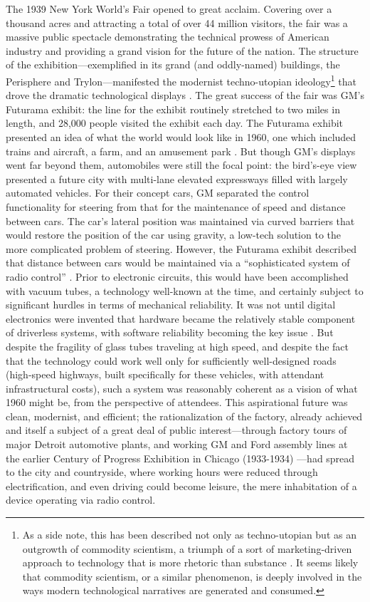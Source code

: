 The 1939 New York World's Fair opened to great acclaim. Covering over
a thousand acres and attracting a total of over 44 million visitors,
the fair was a massive public spectacle demonstrating the technical
prowess of American industry and providing a grand vision for the
future of the nation. The structure of the exhibition---exemplified in
its grand (and oddly-named) buildings, the Perisphere and
Trylon---manifested the modernist techno-utopian ideology\footnote{As a
  side note, this has been described not only as techno-utopian but as
an outgrowth of commodity scientism, a triumph of a sort of
marketing-driven approach to technology that is more rhetoric than
substance \cite{smithSelling}. It seems likely that commodity
scientism, or a similar phenomenon, is deeply involved in the ways
modern technological narratives are generated and consumed.} that drove the
dramatic technological displays \cite[p. 371]{nyeElectrifying}. The
great success of the fair was 
GM's Futurama exhibit: the line for the exhibit routinely stretched to
two miles in length, and 28,000 people visited the exhibit each day.
The Futurama exhibit presented an idea of what the world would look
like in 1960, one which included trains and aircraft, a farm, and an
amusement park \cite[p. 3-4]{wetmore}. But though GM's displays went far beyond them,
automobiles were still the focal point: the bird's-eye view presented a
future city with multi-lane elevated expressways filled with largely
automated vehicles. For their concept cars, GM separated the control
functionality for steering from that for the maintenance of speed and
distance between cars. The car's lateral position was maintained via
curved barriers that would restore the position of the car using
gravity, a low-tech solution to the more complicated problem of
steering. However, the Futurama exhibit described that distance
between cars would be maintained via a ``sophisticated system of radio
control'' \cite[p. 5]{wetmore}. Prior to electronic circuits, this would have been
accomplished with vacuum tubes, a technology well-known at the time,
and certainly subject to significant hurdles in terms of mechanical
reliability. It was not until digital electronics were invented that
hardware became the relatively stable component of driverless systems,
with software reliability becoming the key issue \cite[p.
  15]{wetmore}. But despite the 
fragility of glass tubes traveling at high speed, and despite the fact
that the technology could work well only for sufficiently
well-designed roads (high-speed highways, built specifically for these
vehicles, with attendant infrastructural costs), such a system was
reasonably coherent as a vision of what 1960 might be, from the
perspective of attendees. This aspirational future was clean,
modernist, and efficient; the rationalization of the factory, already
achieved and itself a subject of a great deal of public
interest---through factory tours of major Detroit automotive plants, and
working GM and Ford assembly lines at the earlier Century of Progress
Exhibition in Chicago (1933-1934) \cite[p. 63-64]{nyeAmericas}---had
spread to the city and 
countryside, where working hours were reduced through electrification,
and even driving could become leisure, the mere inhabitation of a
device operating via radio control.

